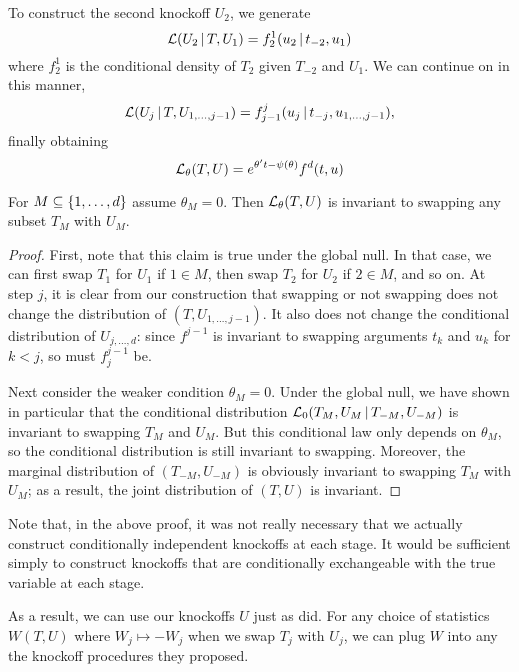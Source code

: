 \documentclass{article}
\begin{document}
To construct the second knockoff $U_2$, we generate
\begin{equation}
  \mathcal{L}(U_2 \,|\, T, U_1) = f_2^1(u_2 \,|\, t_{-2}, u_1)
\end{equation}
where $f_2^1$ is the conditional density of $T_2$ given $T_{-2}$ and $U_1$. We can continue on in this manner,
\begin{equation}
  \mathcal{L}(U_j \,|\, T, U_{1,\ldots,j-1}) = f_{j-1}^j(u_j \,|\, t_{-j}, u_{1,\ldots,j-1}),
\end{equation}
finally obtaining
\begin{equation}\label{eq:finalKnockoff}
    \mathcal{L}_\theta(T,U) = e^{\theta't - \psi(\theta)}f^d(t,u)
\end{equation}

\begin{theorem}
  For $M \subseteq \{1,\ldots,d\}$ assume $\theta_M=0$. Then $\mathcal{L}_\theta(T,U)$ is invariant to swapping any subset $T_M$ with $U_M$.
\end{theorem}
\begin{proof}
First, note that this claim is true under the global null. In that case, we can first swap $T_1$ for $U_1$ if $1\in M$, then swap $T_2$ for $U_2$ if $2\in M$, and so on. At step $j$, it is clear from our construction that swapping or not swapping does not change the distribution of $(T,U_{1,\ldots,j-1})$. It also does not change the conditional distribution of $U_{j,\ldots,d}$: since $f^{j-1}$ is invariant to swapping arguments $t_k$ and $u_k$ for $k<j$, so must $f_j^{j-1}$ be.

Next consider the weaker condition $\theta_M=0$. Under the global null, we have shown in particular that the conditional distribution $\mathcal{L}_0(T_M,U_M \,|\, T_{-M},U_{-M})$ is invariant to swapping $T_M$ and $U_M$. But this conditional law only depends on $\theta_M$, so the conditional distribution is still invariant to swapping. Moreover, the marginal distribution of $(T_{-M},U_{-M})$ is obviously invariant to swapping $T_M$ with $U_M$; as a result, the joint distribution of $(T,U)$ is invariant.
\end{proof}
Note that, in the above proof, it was not really necessary that we actually construct conditionally independent knockoffs at each stage. It would be sufficient simply to construct knockoffs that are conditionally exchangeable with the true variable at each stage.

As a result, we can use our knockoffs $U$ just as \citet{barber2014controlling} did. For any choice of statistics $W(T,U)$ where $W_j\mapsto -W_j$ when we swap $T_j$ with $U_j$, we can plug $W$ into any the knockoff procedures they proposed.
\end{document}
